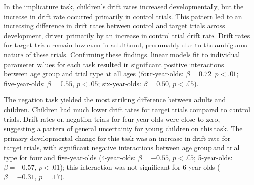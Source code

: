 \documentclass[10pt,letterpaper]{article}
\newcommand{\ejy}[1]{\textcolor{Blue}{[ejy: #1]}}
\newcommand{\aen}[1]{\textcolor{DarkOrange}{[aen: #1]}}
\begin{document}
In the implicature task, children's drift rates increased developmentally, but the increase in drift rate occurred primarily in control trials. This pattern led to an increasing difference in drift rates between control and target trials across development, driven primarily by an increase in control trial drift rate. Drift rates for target trials remain low even in adulthood, presumably due to the ambiguous nature of these trials. Confirming these findings, linear models fit to individual parameter values for each task resulted in significant positive interactions between age group and trial type at all ages (four-year-olds: $\beta = 0.72$, $p <.01$; five-year-olds: $\beta = 0.55$, $p <.05$; six-year-olds: $\beta = 0.50$, $p <.05$).

The negation task yielded the most striking difference between adults and children. Children had much lower drift rates for target trials compared to control trials. Drift rates on negation trials for four-year-olds were close to zero, suggesting a pattern of general uncertainty for young children on this task. The primary developmental change for this task was an increase in drift rate for target trials, with significant negative interactions between age group and trial type for four and five-year-olds (4-year-olds: $\beta = -0.55$, $p <.05$; 5-year-olds: $\beta = -0.57$, $p <.01$); this interaction was not significant for 6-year-olds ($\beta = -0.31$, $p = .17$).


\end{document}
